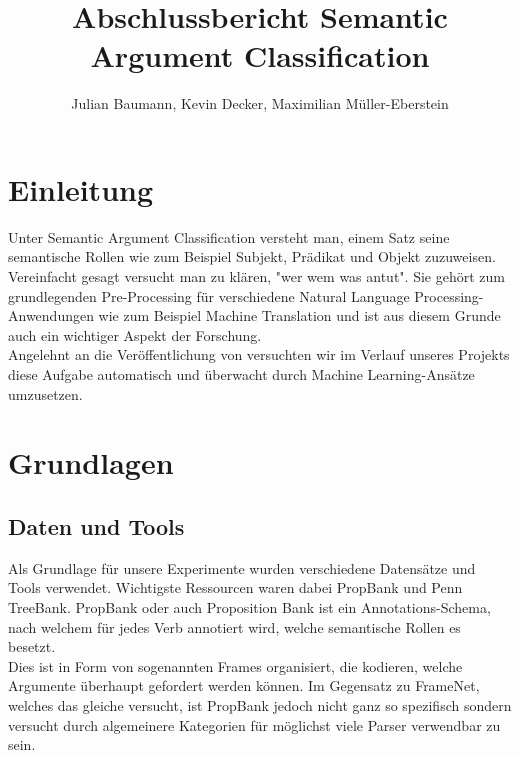 \documentclass[]{article}
\title{Abschlussbericht Semantic Argument Classification}
\author{Julian Baumann, Kevin Decker, Maximilian Müller-Eberstein}
\begin{document}
\maketitle

\section{Einleitung}
Unter Semantic Argument Classification versteht man, einem Satz seine semantische Rollen wie zum Beispiel Subjekt, Prädikat und Objekt zuzuweisen. Vereinfacht gesagt versucht man zu klären, "wer wem was antut". Sie gehört zum grundlegenden Pre-Processing für verschiedene Natural Language Processing-Anwendungen wie zum Beispiel Machine Translation und ist aus diesem Grunde auch ein wichtiger Aspekt der Forschung. \\
Angelehnt an die Veröffentlichung von \cite{Pradhan05supportvector} versuchten wir im Verlauf unseres Projekts diese Aufgabe automatisch und überwacht durch Machine Learning-Ansätze umzusetzen. 

\section{Grundlagen}
\subsection{Daten und Tools}
Als Grundlage für unsere Experimente wurden verschiedene Datensätze und Tools verwendet. Wichtigste Ressourcen waren dabei PropBank und Penn TreeBank. PropBank \cite{Palmer:2005:PBA:1122624.1122628} oder auch Proposition Bank ist ein Annotations-Schema, nach welchem für jedes  Verb annotiert wird, welche semantische Rollen es besetzt. \\ Dies ist in Form von sogenannten Frames organisiert, die kodieren, welche Argumente überhaupt gefordert werden können. Im Gegensatz zu FrameNet, welches das gleiche versucht, ist PropBank jedoch nicht ganz so spezifisch sondern versucht durch algemeinere Kategorien für möglichst viele Parser verwendbar zu sein.\\ 
\end{document}
